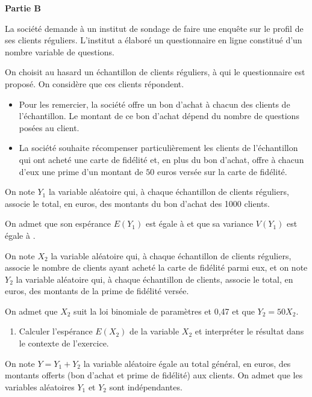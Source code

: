 \medskip

\textbf{Partie B}

\medskip

La société demande à un institut de sondage de faire une enquête sur le profil de ses clients réguliers. L'institut a élaboré un questionnaire en ligne constitué d'un nombre variable de questions.

On choisit au hasard un échantillon de  clients réguliers, à qui le questionnaire est proposé. On considère que ces  clients répondent.

\begin{itemize}[label=$\bullet~$]
\item Pour les remercier, la société offre un bon d'achat à chacun des clients de l'échantillon. Le montant de ce bon d'achat dépend du nombre de questions posées au client.
\item La société souhaite récompenser particulièrement les clients de l'échantillon qui ont acheté une carte de fidélité et, en plus du bon d'achat, offre à chacun d'eux une prime d'un montant de $50$ euros versée sur la carte de fidélité.
\end{itemize}

On note $Y_1$ la variable aléatoire qui, à chaque échantillon de  clients réguliers, associe le total, en euros, des montants du bon d'achat des 1000 clients. 

On admet que son espérance $E\left(Y_1\right)$ est égale à  et que sa variance $V\left(Y_1\right)$ est égale à .

On note $X_2$ la variable aléatoire qui, à chaque échantillon de  clients réguliers, associe le nombre de clients ayant acheté la carte de fidélité parmi eux, et on note $Y_2$ la variable aléatoire qui, à chaque échantillon de  clients, associe le total, en euros, des montants de la prime de fidélité versée.

On admet que $X_2$ suit la loi binomiale de paramètres  et 0,47 et que $Y_2 = 50X_2$.

\medskip


\begin{enumerate}
\item Calculer l'espérance $E\left(X_2\right)$ de la variable $X_2$ et interpréter le résultat dans le contexte de l'exercice.
\end{enumerate}

On note $Y = Y_1 + Y_2$ la variable aléatoire égale au total général, en euros, des montants offerts (bon d'achat et prime de fidélité) aux  clients. On admet que les variables aléatoires $Y_1$ et $Y_2$ sont indépendantes.

